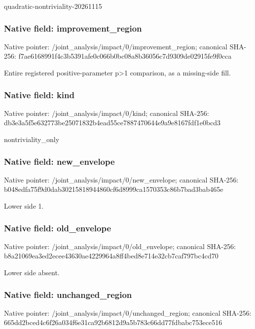 \documentclass[10pt,a4paper]{article}
\begin{document}
\begingroup\raggedright\sloppy quadratic-nontriviality-20261115\par\endgroup

\subsubsection{Native field: improvement\_\allowbreak{}region}
Native pointer: /joint\_\allowbreak{}analysis/impact/0/improvement\_\allowbreak{}region; canonical SHA-256: f7ae6168991f4c3b5391afe0c066b0bc08a8b36056c7d9309de02915fe9f0cca

\begingroup\raggedright\sloppy Entire registered positive-parameter p>1 comparison,\allowbreak{} as a missing-side fill.\par\endgroup

\subsubsection{Native field: kind}
Native pointer: /joint\_\allowbreak{}analysis/impact/0/kind; canonical SHA-256: db3e3a5f5e632773be25071832b4ead55ce7887470644e9a9e8167fdf1e0bcd3

\begingroup\raggedright\sloppy nontriviality\_\allowbreak{}only\par\endgroup

\subsubsection{Native field: new\_\allowbreak{}envelope}
Native pointer: /joint\_\allowbreak{}analysis/impact/0/new\_\allowbreak{}envelope; canonical SHA-256: b048edfa75f9d0dab30215818944860cf6d8999ca1570353c86b7bad3bab465e

\begingroup\raggedright\sloppy Lower side 1.\par\endgroup

\subsubsection{Native field: old\_\allowbreak{}envelope}
Native pointer: /joint\_\allowbreak{}analysis/impact/0/old\_\allowbreak{}envelope; canonical SHA-256: b8a21069ea3ed2ecee43630ae4229964a8ff4bed8e714e32cb7caf797bc4cd70

\begingroup\raggedright\sloppy Lower side absent.\par\endgroup

\subsubsection{Native field: unchanged\_\allowbreak{}region}
Native pointer: /joint\_\allowbreak{}analysis/impact/0/unchanged\_\allowbreak{}region; canonical SHA-256: 665dd2bced4c6f26a034f6e31ca92b6812d9a5b783c66dd77fdbabc753ece516
\end{document}
